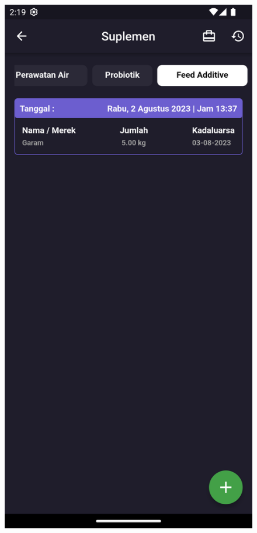 \begin{spacing}{1.5}
\begin{enumerate}
\begin{enumerate}
\begin{itemize}
				\begin{figure}[H]
						\includegraphics[width=\linewidth]{gambar/sprint4/sup_1.png}

\end{figure}
\end{itemize}
\end{enumerate}
\end{enumerate}
\end{spacing}

